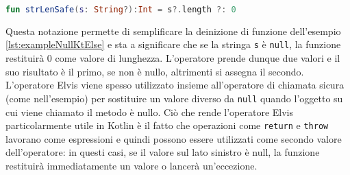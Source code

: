 \begin{lstlisting}[caption={Utilizzo di null-coalescing operator}, captionpos=b, label={lst:exampleNullCoalescing}, language=Kotlin]
fun strLenSafe(s: String?):Int = s?.length ?: 0
\end{lstlisting}
Questa notazione permette di semplificare la deinizione di funzione dell'esempio \ref{lst:exampleNullKtElse} e  sta a significare che se la stringa \texttt{s} è \texttt{null}, la funzione restituirà 0 come valore di lunghezza. L'operatore prende dunque due valori e il suo risultato è il primo, se non è nullo, altrimenti si assegna il secondo. L'operatore Elvis viene spesso utilizzato insieme all'operatore di chiamata sicura (come nell'esempio) per sostituire un valore diverso da \texttt{null} quando l'oggetto su cui viene chiamato il metodo è nullo. Ciò che rende l'operatore Elvis particolarmente utile in Kotlin è il fatto che operazioni come \texttt{return} e \texttt{throw} lavorano come espressioni e quindi possono essere utilizzati come secondo valore dell'operatore: in questi casi, se il valore sul lato sinistro è null, la funzione restituirà immediatamente un valore o lancerà un'eccezione.\\

